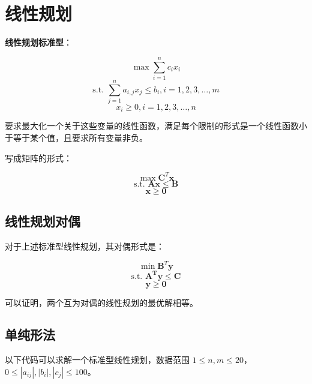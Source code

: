 \section{线性规划}

\begin{tcolorbox}
\textbf{线性规划标准型}：

$$ \max \sum_{i=1}^n c_ix_i $$
$$\text{s.t.\ \ \ } \sum_{j=1}^n a_{i,j}x_j \le b_i , i=1,2,3,\dots,m $$
$$x_i\ge 0,i=1,2,3,\dots,n$$


要求最大化一个关于这些变量的线性函数，满足每个限制的形式是一个线性函数小于等于某个值，且要求所有变量非负。
\end{tcolorbox}

写成矩阵的形式：

$$ \max \mathbf{C}^T \mathbf{x} $$
$$ \text{s.t.\ \ \ } \mathbf{Ax} \le \mathbf{B} $$
$$ \mathbf{x \ge 0}$$

\subsection{线性规划对偶}

对于上述标准型线性规划，其对偶形式是：

$$ \min \mathbf{B}^T \mathbf{y} $$
$$ \text{s.t.\ \ \ } \mathbf{A^Ty} \le \mathbf{C} $$
$$ \mathbf{y \ge 0}$$

可以证明，两个互为对偶的线性规划的最优解相等。

\subsection{单纯形法}

以下代码可以求解一个标准型线性规划，数据范围 $1\leq n,m \leq 20$，$0 \leq |a_{ij}|,|b_i|,|c_j|\leq 100$。

